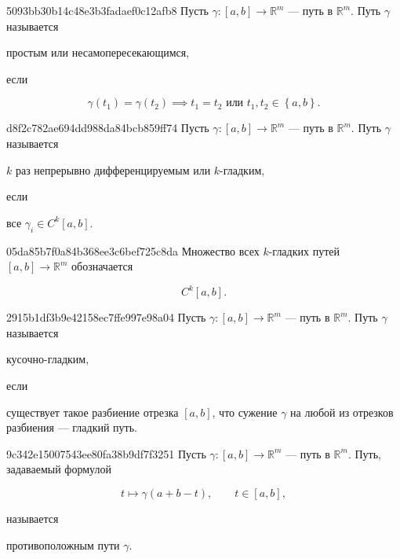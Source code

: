 \begin{note}{5093bb30b14c48e3b3fadaef0c12afb8}
    Пусть \({ \gamma : [a, b] \to \mathbb R^{m} }\) --- путь в \({ \mathbb R^{m} }\).
    Путь \({ \gamma }\) называется \begin{icloze}{2}простым или несамопересекающимся,\end{icloze} если
    \begin{icloze}{1}
        \[
            \gamma(t_1) = \gamma(t_2) \implies t_1 = t_2 \text{ или } t_1, t_2 \in \left\{ a, b \right\}.
        \]
    \end{icloze}
\end{note}

\begin{note}{d8f2c782ae694dd988da84bcb859ff74}
    Пусть \({ \gamma : [a, b] \to \mathbb R^{m} }\) --- путь в \({ \mathbb R^{m} }\).
    Путь \({ \gamma }\) называется \begin{icloze}{2}\({ k }\) раз непрерывно дифференцируемым или \({ k }\)-гладким,\end{icloze} если \begin{icloze}{1}все \({ \gamma_i \in C^{k}[a, b] }\).\end{icloze}
\end{note}

\begin{note}{05da85b7f0a84b368ee3c6bef725c8da}
    Множество всех \({ k }\)-гладких путей \({ [a, b] \to \mathbb R^{m} }\) обозначается
    \begin{icloze}{1}
        \[
            C^{k}[a, b].
        \]
    \end{icloze}
\end{note}

\begin{note}{2915b1df3b9e42158ec7ffe997e98a04}
    Пусть \({ \gamma : [a, b] \to \mathbb R^{m} }\) --- путь в \({ \mathbb R^{m} }\).
    Путь \({ \gamma }\) называется \begin{icloze}{2}ку\-соч\-но-гладким,\end{icloze} если \begin{icloze}{1}существует такое разбиение отрезка \({ [a, b] }\), что
    сужение \({ \gamma }\) на любой из отрезков разбиения --- гладкий путь.\end{icloze}
\end{note}

\begin{note}{9c342e15007543ee80fa38b9df7f3251}
    Пусть \({ \gamma : [a, b] \to \mathbb R^{m} }\) --- путь в \({ \mathbb R^{m} }\).
    Путь, задаваемый формулой
    \begin{icloze}{1}
        \[
            t \mapsto \gamma(a + b - t), \qquad t \in [a, b],
        \]
    \end{icloze}
    называется \begin{icloze}{2}противоположным пути \({ \gamma }\).\end{icloze}
\end{note}

